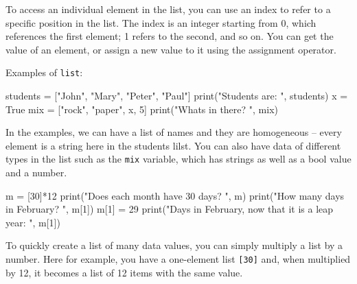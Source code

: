 \documentclass[
  letterpaper,
]{scrbook}
\newenvironment{Shaded}{\begin{snugshade}}{\end{snugshade}}
\newcommand{\BuiltInTok}[1]{\textcolor[rgb]{0.00,0.23,0.31}{#1}}
\newcommand{\DecValTok}[1]{\textcolor[rgb]{0.68,0.00,0.00}{#1}}
\newcommand{\NormalTok}[1]{\textcolor[rgb]{0.00,0.23,0.31}{#1}}
\newcommand{\OperatorTok}[1]{\textcolor[rgb]{0.37,0.37,0.37}{#1}}
\newcommand{\StringTok}[1]{\textcolor[rgb]{0.13,0.47,0.30}{#1}}
\newcommand{\VariableTok}[1]{\textcolor[rgb]{0.07,0.07,0.07}{#1}}
\begin{document}
To access an individual element in the list, you can use an index to
refer to a specific position in the list. The index is an integer
starting from 0, which references the first element; 1 refers to the
second, and so on. You can get the value of an element, or assign a new
value to it using the assignment operator.

Examples of \texttt{list}:

\begin{Shaded}
\begin{Highlighting}[]
\NormalTok{students }\OperatorTok{=}\NormalTok{ [}\StringTok{"John"}\NormalTok{, }\StringTok{"Mary"}\NormalTok{, }\StringTok{"Peter"}\NormalTok{, }\StringTok{"Paul"}\NormalTok{]}
\BuiltInTok{print}\NormalTok{(}\StringTok{"Students are: "}\NormalTok{, students)}
\NormalTok{x }\OperatorTok{=} \VariableTok{True}
\NormalTok{mix }\OperatorTok{=}\NormalTok{ [}\StringTok{"rock"}\NormalTok{, }\StringTok{"paper"}\NormalTok{, x, }\DecValTok{5}\NormalTok{]}
\BuiltInTok{print}\NormalTok{(}\StringTok{"What\textquotesingle{}s in there? "}\NormalTok{, mix)}
\end{Highlighting}
\end{Shaded}

In the examples, we can have a list of names and they are homogeneous --
every element is a string here in the students lilst. You can also have
data of different types in the list such as the \texttt{mix} variable,
which has strings as well as a bool value and a number.

\begin{Shaded}
\begin{Highlighting}[]
\NormalTok{m }\OperatorTok{=}\NormalTok{ [}\DecValTok{30}\NormalTok{]}\OperatorTok{*}\DecValTok{12}
\BuiltInTok{print}\NormalTok{(}\StringTok{"Does each month have 30 days? "}\NormalTok{, m)}
\BuiltInTok{print}\NormalTok{(}\StringTok{"How many days in February? "}\NormalTok{, m[}\DecValTok{1}\NormalTok{])}
\NormalTok{m[}\DecValTok{1}\NormalTok{] }\OperatorTok{=} \DecValTok{29}
\BuiltInTok{print}\NormalTok{(}\StringTok{"Days in February, now that it is a leap year: "}\NormalTok{, m[}\DecValTok{1}\NormalTok{])}
\end{Highlighting}
\end{Shaded}

To quickly create a list of many data values, you can simply multiply a
list by a number. Here for example, you have a one-element list
\texttt{{[}30{]}} and, when multiplied by 12, it becomes a list of 12
items with the same value.
\end{document}

